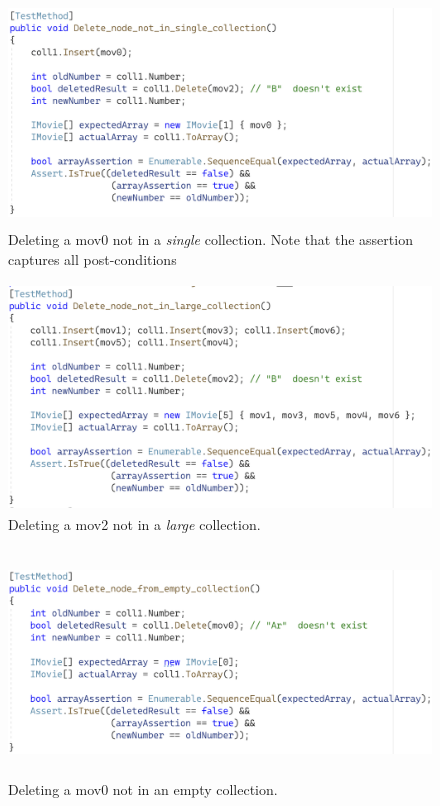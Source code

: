 \documentclass[a4paper]{article}
\begin{document}
\begin{figure}[H]
    \includegraphics[height=6cm]{data/Delete_node_not_in_single_collection.png}
    \caption{Deleting a mov0 not in a \textit{single} collection. Note that the assertion captures all post-conditions}
\end{figure}
\begin{figure}[H]
    \includegraphics[height=6cm]{data/Delete_node_not_in_large_collection.png}
    \caption{Deleting a mov2 not in a \textit{large} collection.}
\end{figure}
\begin{figure}[H]
    \includegraphics[height=6cm]{data/Delete_node_from_empty_collection.png}
    \caption{Deleting a mov0 not in an empty collection.}
\end{figure}
\end{document}
